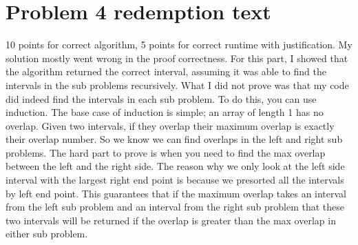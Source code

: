 \documentclass[11pt]{article}
\begin{document}
\section*{Problem 4 redemption text}
10 points for correct algorithm, 5 points for correct runtime with justification. My solution mostly went wrong in the proof correctness. For this part, I showed that the algorithm returned the correct interval, assuming it was able to find the intervals in the sub problems recursively. What I did not prove was that my code did indeed find the intervals in each sub problem. To do this, you can use induction. The base case of induction is simple; an array of length 1 has no overlap. Given two intervals, if they overlap their maximum overlap is exactly their overlap number. So we know we can find overlaps in the left and right sub problems. The hard part to prove is when you need to find the max overlap between the left and the right side. The reason why we only look at the left side interval with the largest right end point is because we presorted all the intervals by left end point. This guarantees that if the maximum overlap takes an interval from the left sub problem and an interval from the right sub problem that these two intervals will be returned if the overlap is greater than the max overlap in either sub problem.

\newpage
\end{document}

